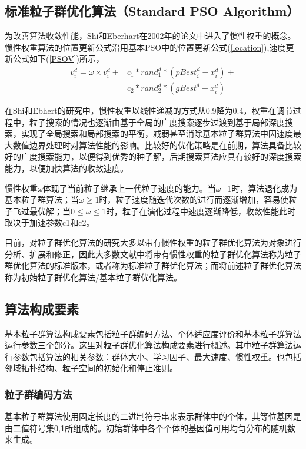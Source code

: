 \subsection{标准粒子群优化算法（Standard PSO Algorithm）}
为改善算法收敛性能，Shi和Eberhart在2002年的论文中进入了惯性权重的概念\cite{Yanxia2002Chaotic}。惯性权重算法的位置更新公式沿用基本PSO中的位置更新公式(\ref{location}),速度更新公式如下(\ref{PSOV})所示，
\begin{equation}
\begin{split}
\label{PSOV}
v_i^d=\omega\times v_i^d+&c_1*{rand}_1^d*({pBest}_i^d-x_i^d)+\\ &c_2*{rand}_2^d*({gBest}^d-x_i^d)
\end{split}
\end{equation}

在Shi和Ebhert的研究中，惯性权重以线性递减的方式从0.9降为0.4，权重在调节过程中，粒子搜索的情况也逐渐由基于全局的广度搜索逐步过渡到基于局部深度搜索，实现了全局搜索和局部搜索的平衡，减弱甚至消除基本粒子群算法中因速度最大数值边界处理时对算法性能的影响。比较好的优化策略是在前期，算法具备比较好的广度搜索能力，以便得到优秀的种子解，后期搜索算法应具有较好的深度搜索能力，以便加快算法的收敛速度。

惯性权重$\omega$体现了当前粒子继承上一代粒子速度的能力。当$\omega$=1时，算法退化成为基本粒子群算法；当$\omega$$\ge$1时，粒子速度随迭代次数的进行而逐渐增加，容易使粒子飞过最优解；当0$\le$$\omega$$\le$1时，粒子在演化过程中速度逐渐降低，收敛性能此时取决于加速参数c1和c2。

目前，对粒子群优化算法的研究大多以带有惯性权重的粒子群优化算法为对象进行分析、扩展和修正，因此大多数文献中将带有惯性权重的粒子群优化算法称为粒子群优化算法的标准版本，或者称为标准粒子群优化算法；而将前述粒子群优化算法称为初始粒子群优化算法/基本粒子群优化算法。

\subsection{算法构成要素}
基本粒子群算法构成要素包括粒子群编码方法、个体适应度评价和基本粒子群算法运行参数三个部分。这里对粒子群优化算法构成要素进行概述。其中粒子群算法运行参数包括算法的相关参数：群体大小、学习因子、最大速度、惯性权重。也包括邻域拓扑结构、粒子空间的初始化和停止准则。
\subsubsection{粒子群编码方法}
基本粒子群算法使用固定长度的二进制符号串来表示群体中的个体，其等位基因是由二值符号集{0,1}所组成的。初始群体中各个个体的基因值可用均匀分布的随机数来生成。
